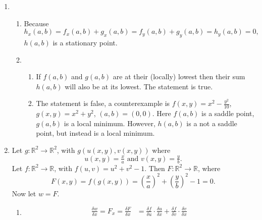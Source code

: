 \documentclass[10pt]{article}
\begin{document}
\begin{enumerate}
\begin{enumerate}
\begin{enumerate}
                    \end{enumerate}
            \end{enumerate}
            \item 
                \begin{enumerate}
                    \item Because $$h_x(a,b) = f_x(a,b) + g_x(a,b) = f_y(a,b) + g_y(a,b) = h_y(a,b) = 0,$$ $h(a,b)$ is a stationary point.
                    \item
                    \begin{enumerate}
                        \item If $f(a,b)$ and $g(a,b)$ are at their (locally)
                            lowest then their sum $h(a,b)$ will also be at its
                            lowest. The statement is true.
                        \item The statement is false, a counterexample is
                            $f(x,y) = x^2 - \tfrac{y^2}{10}$, $g(x,y) = x^2 +
                            y^2$, $(a, b) = (0, 0)$. Here $f(a,b)$ is a saddle
                            point, $g(a,b)$ is a local minimum. However,
                            $h(a,b)$ is a not a saddle point, but instead is a
                            local minimum.
                    \end{enumerate}
                \end{enumerate}
                \item Let $g : \mathbb{R}^2 \longrightarrow \mathbb{R}^2$,
                    with $g(u(x,y),v(x,y))$
                    where
                        $$u(x,y) = \tfrac{x}{a} \text{ and } v(x,y) = \tfrac{y}{b}.$$
                    Let $f : \mathbb{R}^2 \longrightarrow \mathbb{R}$,
                    with $f(u,v) = u^2 + v^2 - 1$.
                    Then $F : \mathbb{R}^2 \longrightarrow \mathbb{R}$,
                    where
                        $$F(x,y) = f(g(x,y)) = \left(\frac{x}{a}\right)^2 + \left(\frac{y}{b}\right)^2 - 1 = 0.$$
                    Now let $w = F$.
                    \begin{enumerate}
                        \item
                            \begin{align*}
                                \frac{\delta w}{\delta x} = F_x = \frac{\delta F}{\delta x} &=
                                \frac{\delta f}{\delta u} \cdot \frac{\delta u}{\delta x} + \frac{\delta f}{\delta v} \cdot \frac{\delta v}{\delta x} \\

\end{align*}
\end{enumerate}
\end{enumerate}
\end{document}
